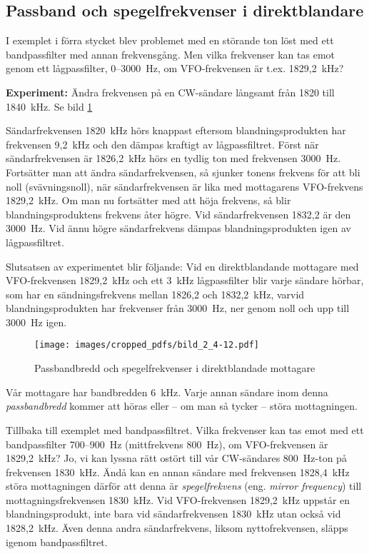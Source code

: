 \subsection{Passband och spegelfrekvenser i direktblandare}

I exemplet i förra stycket blev problemet med en störande ton löst med
ett bandpassfilter med annan frekvensgång.
Men vilka frekvenser kan tas emot genom ett lågpassfilter, 0--3000~Hz,
om VFO-frekvensen är t.ex. 1829,2~kHz?

\textbf{Experiment:}
Ändra frekvensen på en CW-sändare långsamt från 1820 till 1840~kHz.
Se bild \ref{fig:bildII4-12}

Sändarfrekvensen 1820~kHz hörs knappast eftersom blandningsprodukten har
frekvensen 9,2~kHz och den dämpas kraftigt av lågpassfiltret.
Först när sändarfrekvensen är 1826,2~kHz hörs en tydlig ton med frekvensen
3000~Hz.
Fortsätter man att ändra sändarfrekvensen, så sjunker tonens frekvens för att
bli noll (svävningsnoll), när sändarfrekvensen är lika med mottagarens
VFO-frekvens 1829,2~kHz.
Om man nu fortsätter med att höja frekvens, så blir blandningsproduktens
frekvens åter högre.
Vid sändarfrekvensen 1832,2 är den 3000~Hz. Vid ännu högre sändarfrekvens
dämpas blandningsprodukten igen av lågpassfiltret.

Slutsatsen av experimentet blir följande:
Vid en direktblandande mottagare med VFO-frekvensen 1829,2~kHz och ett 3~kHz
lågpassfilter blir varje sändare hörbar, som har en sändningsfrekvens mellan
1826,2 och 1832,2~kHz, varvid blandningsprodukten har frekvenser från 3000~Hz, ner
genom noll och upp till 3000~Hz igen.

\begin{figure}
  \texttt{[image: images/cropped\_pdfs/bild\_2\_4-12.pdf]}
  \caption{Passbandbredd och spegelfrekvenser i direktblandade mottagare}
  \label{fig:bildII4-12}
\end{figure}

Vår mottagare har bandbredden 6~kHz.
Varje annan sändare inom denna \emph{passbandbredd} kommer att höras eller --
om man så tycker -- störa mottagningen.

Tillbaka till exemplet med bandpassfiltret.
Vilka frekvenser kan tas emot med ett bandpassfilter 700--900~Hz
(mittfrekvens 800~Hz), om VFO-frekvensen är 1829,2~kHz?
Jo, vi kan lyssna rätt ostört till vår CW-sändares 800~Hz-ton på frekvensen
1830~kHz.
Ändå kan en annan sändare med frekvensen 1828,4~kHz störa mottagningen därför
att denna är \emph{spegelfrekvens} (eng. \emph{mirror frequency}) till
mottagningsfrekvensen 1830~kHz.
Vid VFO-frekvensen 1829,2~kHz uppstår en blandningsprodukt, inte bara vid
sändarfrekvensen 1830~kHz utan också vid 1828,2~kHz.
Även denna andra sändarfrekvens, liksom nyttofrekvensen, släpps igenom
bandpassfiltret.

